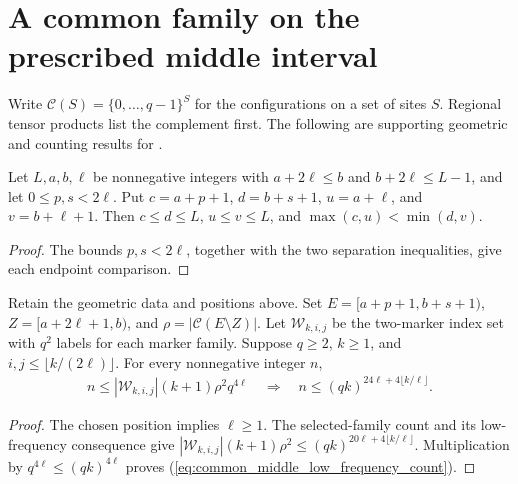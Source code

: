 \section{A common family on the prescribed middle interval}

Write $\mathcal C(S)=\{0,\ldots,q-1\}^S$ for the configurations on a
set of sites $S$. Regional tensor products list the complement first.
The following are supporting geometric and counting results for
\cite[Proposition~5.7]{Arad2016RigorousRG}.

\begin{lemma}
    \label{thm:common_middle_interval_bounds}
    \leanok
    Let $L,a,b,\ell$ be nonnegative integers with $a+2\ell\le b$ and
    $b+2\ell\le L-1$, and let $0\le p,s<2\ell$. Put
    $c=a+p+1$, $d=b+s+1$, $u=a+\ell$, and $v=b+\ell+1$. Then
    $c\le d\le L$, $u\le v\le L$, and $\max(c,u)<\min(d,v)$.
\end{lemma}
\begin{proof}\leanok
    The bounds $p,s<2\ell$, together with the two separation inequalities,
    give each endpoint comparison.
\end{proof}

\begin{lemma}
    \label{thm:common_middle_low_frequency_cardinality}
    \leanok
    Retain the geometric data and positions above. Set $E=[a+p+1,b+s+1)$,
    $Z=[a+2\ell+1,b)$, and $\rho=|\mathcal C(E\setminus Z)|$.
    Let $\mathcal W_{k,i,j}$ be the two-marker index set with $q^2$ labels
    for each marker family. Suppose $q\ge2$, $k\ge1$, and
    $i,j\le\lfloor k/(2\ell)\rfloor$. For every nonnegative integer $n$,
    \begin{align}
        n\le |\mathcal W_{k,i,j}|(k+1)\rho^2q^{4\ell}
        \quad\Longrightarrow\quad
        n\le(qk)^{24\ell+4\lfloor k/\ell\rfloor}.
        \label{eq:common_middle_low_frequency_count}
    \end{align}
\end{lemma}
\begin{proof}\leanok
    The chosen position implies $\ell\ge1$. The selected-family count and its
    low-frequency consequence give
    $|\mathcal W_{k,i,j}|(k+1)\rho^2\le(qk)^{20\ell+4\lfloor k/\ell\rfloor}$.
    Multiplication by $q^{4\ell}\le(qk)^{4\ell}$ proves
    (\ref{eq:common_middle_low_frequency_count}).
\end{proof}

